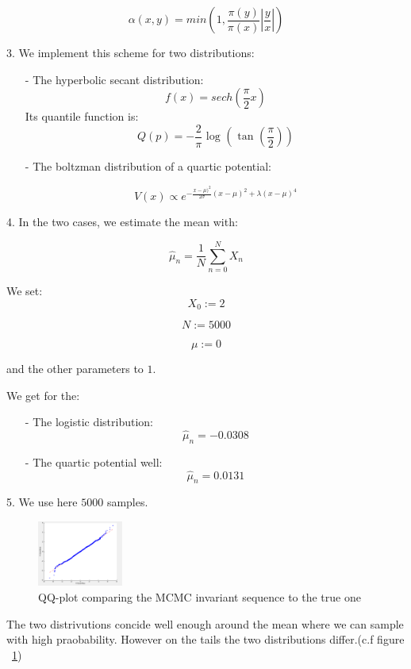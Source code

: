 \documentclass[paper=a4, fontsize=11pt]{scrartcl} %
\numberwithin{equation}{section} %
\numberwithin{figure}{section} %
\numberwithin{table}{section} %
\begin{document}
	\begin{equation}
		\alpha(x,y)=min(1,\frac{\pi(y)}{\pi(x)} |\frac{y}{x}| ) 
	\end{equation}
	
	3. We implement this scheme for two distributions:
	\begin{itemize}
		\item[-] The hyperbolic secant distribution:
		$$f(x)=sech(\frac{\pi}{2}x)$$
		Its quantile function is:
		$$Q(p)=-\frac{2}{\pi} \text{\ log } ( \text{\ tan }(\frac{\pi}{2}))$$
		
		\item[-] The boltzman distribution of a quartic potential:
		
		$$V(x) \propto e^{-\frac{x-\mu)^2}{2 \sigma}(x-\mu)^2+\lambda(x-\mu)^4}$$
	\end{itemize}
	
	4. In the two cases, we estimate the mean with:
	
	$$\hat{\mu}_n=\frac{1}{N}\sum_{n=0}^{N}X_n$$
	
	We set:
	$$X_0:=2$$
	
	$$N:=5000$$
	
	$$\mu := 0$$
	
	and the other parameters to $1$.
	
	We get for the:
	\begin{itemize}
		\item[-] The logistic distribution:
		$$\hat{\mu}_n=-0.0308$$
		\item[-] The quartic potential well:
		$$\hat{\mu}_n=0.0131$$
	\end{itemize}
	
	5. We use here $5000$ samples.
	\begin{figure}
		\centering
		\includegraphics[width=0.25\textwidth]{qqplot}
		\caption{\label{fig:qqplot}QQ-plot comparing the MCMC invariant sequence to the true one}
	\end{figure}
	
	The two distrivutions concide well enough around the mean where we can sample with high praobability. However on the tails the two distributions differ.(c.f figure ~\ref{fig:qqplot})\\
	
\end{document}
